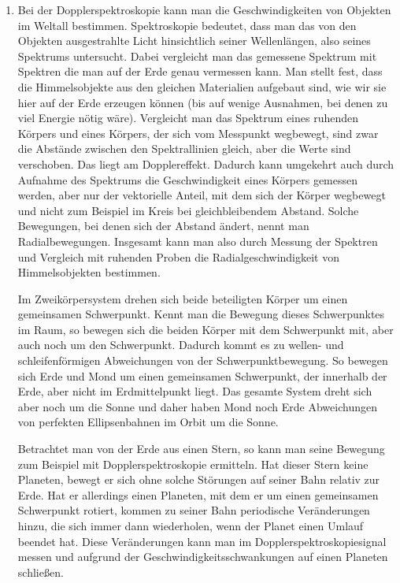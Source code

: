 \begin{enumerate}
	\item Bei der Dopplerspektroskopie kann man die Geschwindigkeiten von Objekten im Weltall bestimmen. Spektroskopie bedeutet, dass man das von den Objekten ausgestrahlte Licht hinsichtlich seiner Wellenlängen, also seines Spektrums untersucht. Dabei vergleicht man das gemessene Spektrum mit Spektren die man auf der Erde genau vermessen kann. Man stellt fest, dass die Himmelsobjekte aus den gleichen Materialien aufgebaut sind, wie wir sie hier auf der Erde erzeugen können (bis auf wenige Ausnahmen, bei denen zu viel Energie nötig wäre). Vergleicht man das Spektrum eines ruhenden Körpers und eines Körpers, der sich vom Messpunkt wegbewegt, sind zwar die Abstände zwischen den Spektrallinien gleich, aber die Werte sind verschoben. Das liegt am Dopplereffekt. Dadurch kann umgekehrt auch durch Aufnahme des Spektrums die Geschwindigkeit eines Körpers gemessen werden, aber nur der vektorielle Anteil, mit dem sich der Körper wegbewegt und nicht zum Beispiel im Kreis bei gleichbleibendem Abstand. Solche Bewegungen, bei denen sich der Abstand ändert, nennt man Radialbewegungen. Insgesamt kann man also durch Messung der Spektren und Vergleich mit ruhenden Proben die Radialgeschwindigkeit von Himmelsobjekten bestimmen.
	
	Im Zweikörpersystem drehen sich beide beteiligten Körper um einen gemeinsamen Schwerpunkt. Kennt man die Bewegung dieses Schwerpunktes im Raum, so bewegen sich die beiden Körper mit dem Schwerpunkt mit, aber auch noch um den Schwerpunkt. Dadurch kommt es zu wellen- und schleifenförmigen Abweichungen von der Schwerpunktbewegung. So bewegen sich Erde und Mond um einen gemeinsamen Schwerpunkt, der innerhalb der Erde, aber nicht im Erdmittelpunkt liegt. Das gesamte System dreht sich aber noch um die Sonne und daher haben Mond noch Erde Abweichungen von perfekten Ellipsenbahnen im Orbit um die Sonne.

	Betrachtet man von der Erde aus einen Stern, so kann man seine Bewegung zum Beispiel mit Dopplerspektroskopie ermitteln. Hat dieser Stern keine Planeten, bewegt er sich ohne solche Störungen auf seiner Bahn relativ zur Erde. Hat er allerdings einen Planeten, mit dem er um einen gemeinsamen Schwerpunkt rotiert, kommen zu seiner Bahn periodische Veränderungen hinzu, die sich immer dann wiederholen, wenn der Planet einen Umlauf beendet hat. Diese Veränderungen kann man im Dopplerspektroskopiesignal messen und aufgrund der Geschwindigkeitsschwankungen auf einen Planeten schließen. 
	

\end{enumerate}
